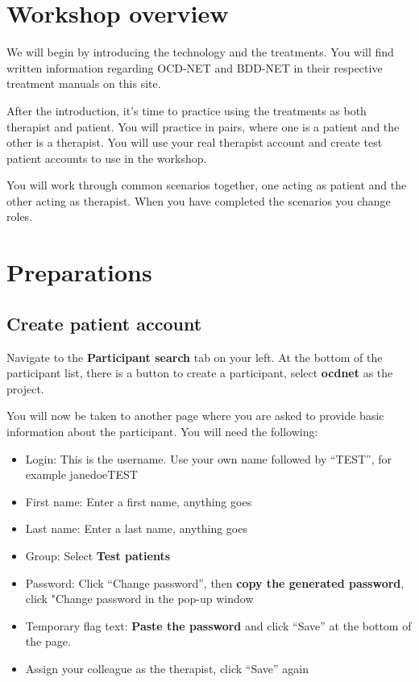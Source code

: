 \documentclass[]{book}
\providecommand{\tightlist}{%
  \setlength{\itemsep}{0pt}\setlength{\parskip}{0pt}}
\begin{document}
\hypertarget{workshop-overview}{%
\section{Workshop overview}\label{workshop-overview}}

We will begin by introducing the technology and the treatments. You will find written information regarding OCD-NET and BDD-NET in their respective treatment manuals on this site.

After the introduction, it's time to practice using the treatments as both therapist and patient. You will practice in pairs, where one is a patient and the other is a therapist. You will use your real therapist account and create test patient accounts to use in the workshop.

You will work through common scenarios together, one acting as patient and the other acting as therapist. When you have completed the scenarios you change roles.

\hypertarget{preparations}{%
\section{Preparations}\label{preparations}}

\hypertarget{create-patient-account}{%
\subsection{Create patient account}\label{create-patient-account}}

Navigate to the \textbf{Participant search} tab on your left. At the bottom of the participant list, there is a button to create a participant, select \textbf{ocdnet} as the project.

You will now be taken to another page where you are asked to provide basic information about the participant. You will need the following:

\begin{itemize}
\tightlist
\item
  Login: This is the username. Use your own name followed by ``TEST'', for example janedoeTEST
\item
  First name: Enter a first name, anything goes
\item
  Last name: Enter a last name, anything goes
\item
  Group: Select \textbf{Test patients}
\item
  Password: Click ``Change password'', then \textbf{copy the generated password}, click "Change password in the pop-up window
\item
  Temporary flag text: \textbf{Paste the password} and click ``Save'' at the bottom of the page.
\item
  Assign your colleague as the therapist, click ``Save'' again
\end{itemize}
\end{document}

